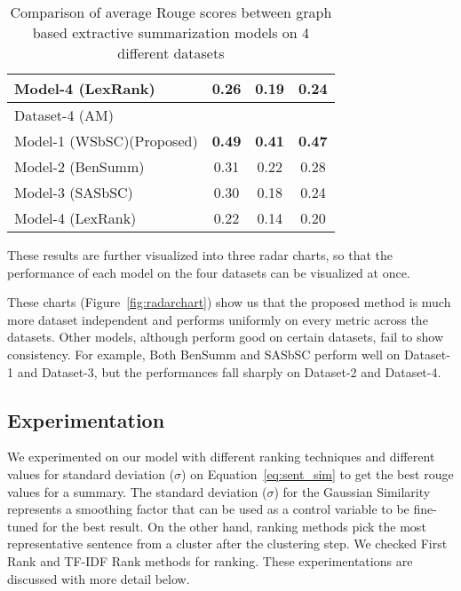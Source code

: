 \begin{table}[]
\begin{tabular}{lccc}
         Model-4 (LexRank)~\cite{Erkan-lexRank-2004}                    & 0.26          & 0.19          & 0.24          \\\hline
         Dataset-4 (AM)                                                 &               &               &               \\\hline
         Model-1 (WSbSC)(Proposed)                                      & \textbf{0.49} & \textbf{0.41} & \textbf{0.47} \\
         Model-2 (BenSumm)~\cite{chowdhury-etal-2021-tfidf-clustering}  & 0.31          & 0.22          & 0.28          \\
         Model-3 (SASbSC)~\cite{roychowdhury-etal-2022-spectral-base}   & 0.30          & 0.18          & 0.24          \\
         Model-4 (LexRank)~\cite{Erkan-lexRank-2004}                    & 0.22          & 0.14          & 0.20          \\
    \end{tabular}
    \caption{Comparison of average Rouge scores between graph based extractive summarization models on 4 different datasets}
    \label{tab:result_comparison-1}
\end{table}

These results are further visualized into three radar charts, so that the performance of each model on the four datasets can be visualized at once.

These charts (Figure~\ref{fig:radarchart}) show us that the proposed method is much more dataset independent and performs uniformly on every metric across the datasets. Other models, although perform good on certain datasets, fail to show consistency. For example, Both BenSumm and SASbSC perform well on Dataset-1 and Dataset-3, but the performances fall sharply on Dataset-2 and Dataset-4.

\subsection{Experimentation}\label{subsec:experimentation}
We experimented on our model with different ranking techniques and different values for standard deviation ($\sigma$) on Equation~\ref{eq:sent_sim} to get the best rouge values for a summary. The standard deviation ($\sigma$) for the Gaussian Similarity represents a smoothing factor that can be used as a control variable to be fine-tuned for the best result. On the other hand, ranking methods pick the most representative sentence from a cluster after the clustering step. We checked First Rank and TF-IDF Rank methods for ranking. These experimentations are discussed with more detail below.

